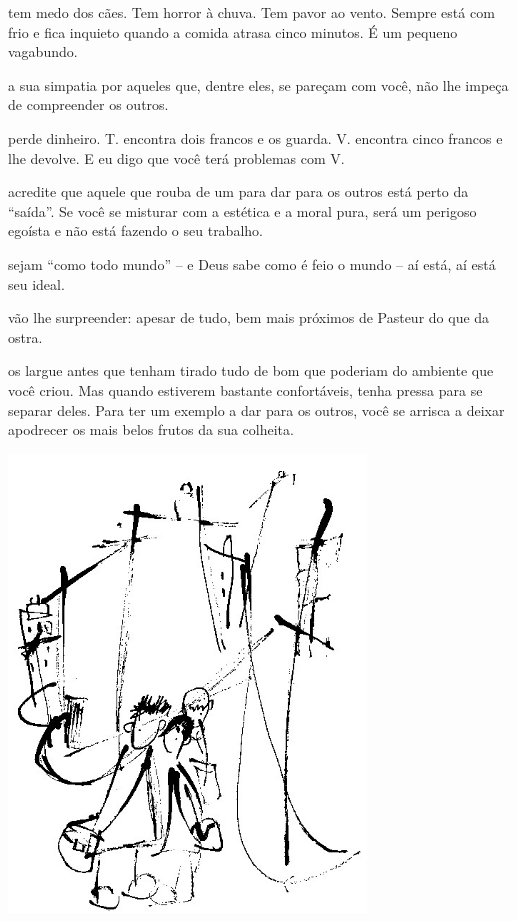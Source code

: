  tem medo dos cães. Tem horror à chuva. Tem pavor ao vento. Sempre
está com frio e fica inquieto quando a comida atrasa cinco minutos. É um
pequeno vagabundo.

\bigskip
\bigskip

 a sua simpatia por aqueles que, dentre eles, se pareçam com você,
não lhe impeça de compreender os outros.

\bigskip
\bigskip

 perde dinheiro. T. encontra dois francos e os guarda. V. encontra
cinco francos e lhe devolve. E eu digo que você terá problemas com V.

\bigskip
\bigskip

 acredite que aquele que rouba de um para dar para os outros está
perto da ``saída''. Se você se misturar com a estética e a moral pura,
será um perigoso egoísta e não está fazendo o seu trabalho.

\bigskip
\bigskip

 sejam ``como todo mundo'' -- e Deus sabe como é feio o mundo -- aí
está, aí está seu ideal.

\bigskip
\bigskip

 vão lhe surpreender: apesar de tudo, bem mais próximos de Pasteur
do que da ostra.

\bigskip
\bigskip

 os largue antes que tenham tirado tudo de bom que poderiam do
ambiente que você criou. Mas quando estiverem bastante confortáveis,
tenha pressa para se separar deles. Para ter um exemplo a dar para os
outros, você se arrisca a deixar apodrecer os mais belos frutos da sua
colheita.

\bigskip
\bigskip


\pagebreak
\thispagestyle{empty}

\begin{vplace}[.50]
\begin{center}
\includegraphics[width=95mm]{./imgs/Image_12.jpg}
\end{center}
\end{vplace}

